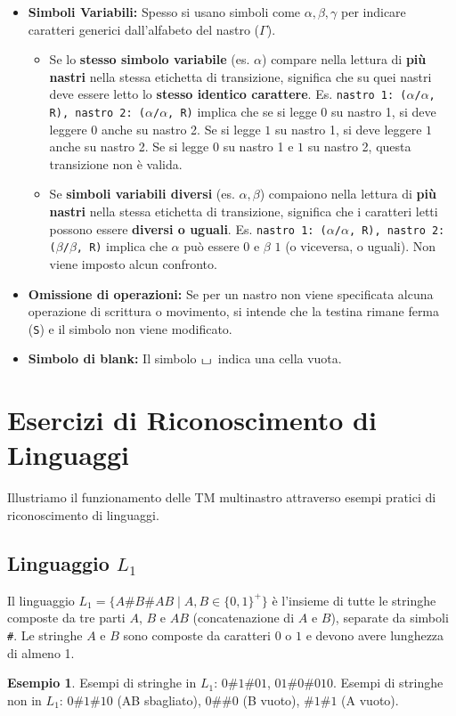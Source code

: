 \documentclass[a4paper]{article}
\theoremstyle{definition} %
\newtheorem{example}{Esempio}
\newcommand{\blankS}{\ensuremath{\raisebox{-0.15ex}{\scalebox{1.3}[0.7]{$\sqcup$}}\mkern2mu}}
\begin{document}
\begin{itemize}
    \item \textbf{Simboli Variabili:} Spesso si usano simboli come $\alpha, \beta, \gamma$ per indicare caratteri generici dall'alfabeto del nastro ($\Gamma$).
    \begin{itemize}
        \item Se lo \textbf{stesso simbolo variabile} (es. $\alpha$) compare nella lettura di \textbf{più nastri} nella stessa etichetta di transizione, significa che su quei nastri deve essere letto lo \textbf{stesso identico carattere}. Es. \texttt{nastro 1: ($\alpha$/$\alpha$, R), nastro 2: ($\alpha$/$\alpha$, R)} implica che se si legge $0$ su nastro 1, si deve leggere $0$ anche su nastro 2. Se si legge $1$ su nastro 1, si deve leggere $1$ anche su nastro 2. Se si legge $0$ su nastro 1 e $1$ su nastro 2, questa transizione non è valida.
        \item Se \textbf{simboli variabili diversi} (es. $\alpha, \beta$) compaiono nella lettura di \textbf{più nastri} nella stessa etichetta di transizione, significa che i caratteri letti possono essere \textbf{diversi o uguali}. Es. \texttt{nastro 1: ($\alpha$/$\alpha$, R), nastro 2: ($\beta$/$\beta$, R)} implica che $\alpha$ può essere $0$ e $\beta$ $1$ (o viceversa, o uguali). Non viene imposto alcun confronto.
    \end{itemize}
    \item \textbf{Omissione di operazioni:} Se per un nastro non viene specificata alcuna operazione di scrittura o movimento, si intende che la testina rimane ferma (\texttt{S}) e il simbolo non viene modificato.
    \item \textbf{Simbolo di blank:} Il simbolo $\blankS$ indica una cella vuota.
\end{itemize}

\section{Esercizi di Riconoscimento di Linguaggi}
Illustriamo il funzionamento delle TM multinastro attraverso esempi pratici di riconoscimento di linguaggi.

\subsection{Linguaggio $L_1$}
Il linguaggio $L_1 = \{A\#B\#AB \mid A,B \in \{0,1\}^+\}$ è l'insieme di tutte le stringhe composte da tre parti $A$, $B$ e $AB$ (concatenazione di $A$ e $B$), separate da simboli \texttt{\#}. Le stringhe $A$ e $B$ sono composte da caratteri $0$ o $1$ e devono avere lunghezza di almeno 1.
\begin{example}
Esempi di stringhe in $L_1$: $0\texttt{\#}1\texttt{\#}01$, $01\texttt{\#}0\texttt{\#}010$.
Esempi di stringhe non in $L_1$: $0\texttt{\#}1\texttt{\#}10$ (AB sbagliato), $0\texttt{\#}\texttt{\#}0$ (B vuoto), $\texttt{\#}1\texttt{\#}1$ (A vuoto).
\end{example}
\end{document}
